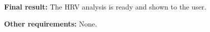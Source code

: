 \documentclass{article}
\begin{document}
\textbf{Final result:} The HRV analysis is ready and shown to the user.

\textbf{Other requirements:} None.







































\end{document}
